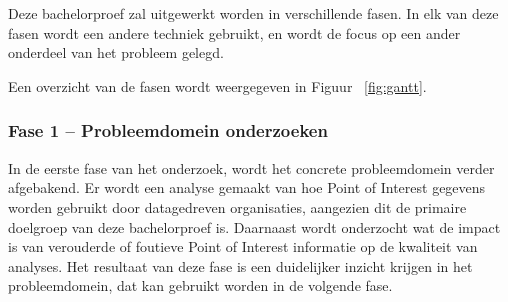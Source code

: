 
\chapter{}%
\label{ch:methodologie}


Deze bachelorproef zal uitgewerkt worden in verschillende fasen. In elk van deze fasen wordt een andere techniek gebruikt, en wordt de focus op een ander onderdeel van het probleem gelegd.

Een overzicht van de fasen wordt weergegeven in Figuur ~\ref{fig:gantt}.

\subsection{Fase 1 – Probleemdomein onderzoeken}
In de eerste fase van het onderzoek, wordt het concrete probleemdomein verder afgebakend. Er wordt een analyse gemaakt van hoe Point of Interest gegevens worden gebruikt door datagedreven organisaties, aangezien dit de primaire doelgroep van deze bachelorproef is. Daarnaast wordt onderzocht wat de impact is van verouderde of foutieve Point of Interest informatie op de kwaliteit van analyses. Het resultaat van deze fase is een duidelijker inzicht krijgen in het probleemdomein, dat kan gebruikt worden in de volgende fase.

